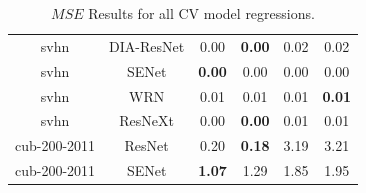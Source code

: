 \begin{table}[t]
\begin{center}
\begin{tabular}{|c|c|c|c|c|c|}
 svhn & DIA-ResNet  & 0.00 &  \textbf{0.00} & 0.02 & 0.02 \\
 svhn & SENet  & \textbf{0.00} &  0.00 & 0.00 & 0.00 \\
 svhn & WRN  & 0.01 &  0.01 & 0.01 & \textbf{0.01} \\
 svhn & ResNeXt  & 0.00 &  \textbf{0.00} & 0.01 & 0.01 \\
\hline
 cub-200-2011 & ResNet  & 0.20 &  \textbf{0.18} & 3.19 & 3.21 \\
 cub-200-2011 & SENet  & \textbf{1.07} &  1.29 & 1.85 & 1.95 \\
\hline
\end{tabular}
\end{center}
\vspace{-5mm}
\caption{$MSE$ Results for all CV model regressions. }
\label{table:MSEresults}
\end{table}


